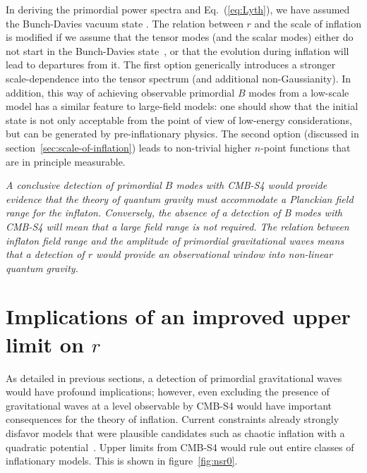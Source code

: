 In deriving the primordial power spectra and Eq.~(\ref{eq:Lyth}), we have assumed the Bunch-Davies vacuum state \cite{BunchDavies}. The relation between $r$ and the scale of inflation is modified if we assume that the tensor  modes (and the scalar modes) either do not start in the Bunch-Davies state~\cite{Ashoorioon:2014nta,Collins:2014yua}, or that the evolution during inflation will lead to departures from it. The first option generically introduces a stronger scale-dependence into the tensor spectrum \cite{Aravind:2014axa,Flauger:2013hra} (and additional non-Gaussianity). In addition, this way of achieving observable primordial $B$ modes from a low-scale model has a similar feature to large-field models: one should show that the initial state is not only acceptable from the point of view of low-energy considerations, but can be generated by pre-inflationary physics. The second option (discussed in section~\ref{sec:scale-of-inflation}) leads to non-trivial higher $n$-point functions that are in principle measurable.

{\it A conclusive detection of primordial $B$ modes with CMB-S4 would provide evidence that the theory of quantum gravity must accommodate a Planckian field range for the inflaton. Conversely, the absence of a detection of B modes with CMB-S4 will mean that a large field range is not required. The relation between inflaton field range and the amplitude of primordial gravitational waves means that a detection of $r$ would provide an observational window into non-linear quantum gravity.}


\section{Implications of an improved upper limit on $r$} 
\label{sec:upperLimits}
As detailed in previous sections, a detection of primordial gravitational waves would have profound implications; however, even excluding the presence of gravitational waves at a level observable by CMB-S4 would have important consequences for the theory of inflation. Current constraints already strongly disfavor models that were plausible candidates such as chaotic inflation with a quadratic potential~\cite{Ade:2015tva}. Upper limits from CMB-S4 would rule out entire classes of inflationary models. This is shown in figure~\ref{fig:nsr0}. 

